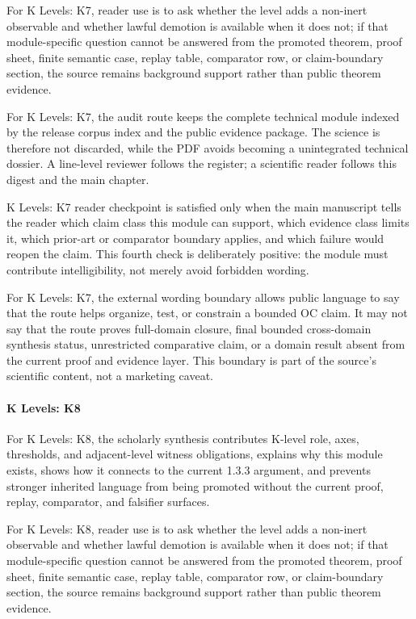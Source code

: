 For K Levels: K7, reader use is to ask whether the level adds a non-inert observable and whether lawful demotion is available when it does not; if that module-specific question cannot be answered from the promoted theorem, proof sheet, finite semantic case, replay table, comparator row, or claim-boundary section, the source remains background support rather than public theorem evidence.


For K Levels: K7, the audit route keeps the complete technical module indexed by the release corpus index and the public evidence package. The science is therefore not discarded, while the PDF avoids becoming a unintegrated technical dossier. A line-level reviewer follows the register; a scientific reader follows this digest and the main chapter.


K Levels: K7 reader checkpoint is satisfied only when the main manuscript tells the reader which claim class this module can support, which evidence class limits it, which prior-art or comparator boundary applies, and which failure would reopen the claim. This fourth check is deliberately positive: the module must contribute intelligibility, not merely avoid forbidden wording.


For K Levels: K7, the external wording boundary allows public language to say that the route helps organize, test, or constrain a bounded OC claim. It may not say that the route proves full-domain closure, final bounded cross-domain synthesis status, unrestricted comparative claim, or a domain result absent from the current proof and evidence layer. This boundary is part of the source's scientific content, not a marketing caveat.


\paragraph{K Levels: K8}

For K Levels: K8, the scholarly synthesis contributes K-level role, axes, thresholds, and adjacent-level witness obligations, explains why this module exists, shows how it connects to the current 1.3.3 argument, and prevents stronger inherited language from being promoted without the current proof, replay, comparator, and falsifier surfaces.


For K Levels: K8, reader use is to ask whether the level adds a non-inert observable and whether lawful demotion is available when it does not; if that module-specific question cannot be answered from the promoted theorem, proof sheet, finite semantic case, replay table, comparator row, or claim-boundary section, the source remains background support rather than public theorem evidence.


